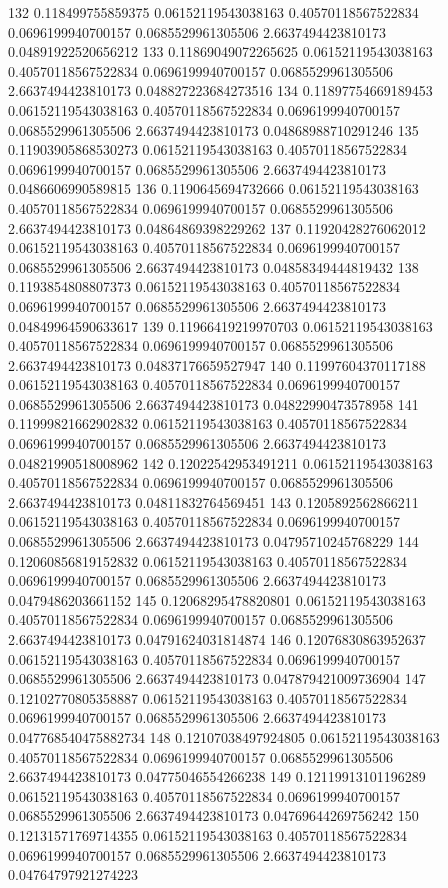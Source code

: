 {132 0.118499755859375 0.06152119543038163 0.40570118567522834 0.0696199940700157 0.0685529961305506 2.6637494423810173 0.04891922520656212
133 0.11869049072265625 0.06152119543038163 0.40570118567522834 0.0696199940700157 0.0685529961305506 2.6637494423810173 0.048827223684273516
134 0.11897754669189453 0.06152119543038163 0.40570118567522834 0.0696199940700157 0.0685529961305506 2.6637494423810173 0.04868988710291246
135 0.11903905868530273 0.06152119543038163 0.40570118567522834 0.0696199940700157 0.0685529961305506 2.6637494423810173 0.0486606990589815
136 0.1190645694732666 0.06152119543038163 0.40570118567522834 0.0696199940700157 0.0685529961305506 2.6637494423810173 0.04864869398229262
137 0.11920428276062012 0.06152119543038163 0.40570118567522834 0.0696199940700157 0.0685529961305506 2.6637494423810173 0.04858349444819432
138 0.1193854808807373 0.06152119543038163 0.40570118567522834 0.0696199940700157 0.0685529961305506 2.6637494423810173 0.04849964590633617
139 0.11966419219970703 0.06152119543038163 0.40570118567522834 0.0696199940700157 0.0685529961305506 2.6637494423810173 0.04837176659527947
140 0.11997604370117188 0.06152119543038163 0.40570118567522834 0.0696199940700157 0.0685529961305506 2.6637494423810173 0.04822990473578958
141 0.11999821662902832 0.06152119543038163 0.40570118567522834 0.0696199940700157 0.0685529961305506 2.6637494423810173 0.04821990518008962
142 0.12022542953491211 0.06152119543038163 0.40570118567522834 0.0696199940700157 0.0685529961305506 2.6637494423810173 0.04811832764569451
143 0.1205892562866211 0.06152119543038163 0.40570118567522834 0.0696199940700157 0.0685529961305506 2.6637494423810173 0.04795710245768229
144 0.12060856819152832 0.06152119543038163 0.40570118567522834 0.0696199940700157 0.0685529961305506 2.6637494423810173 0.0479486203661152
145 0.12068295478820801 0.06152119543038163 0.40570118567522834 0.0696199940700157 0.0685529961305506 2.6637494423810173 0.04791624031814874
146 0.12076830863952637 0.06152119543038163 0.40570118567522834 0.0696199940700157 0.0685529961305506 2.6637494423810173 0.047879421009736904
147 0.12102770805358887 0.06152119543038163 0.40570118567522834 0.0696199940700157 0.0685529961305506 2.6637494423810173 0.047768540475882734
148 0.12107038497924805 0.06152119543038163 0.40570118567522834 0.0696199940700157 0.0685529961305506 2.6637494423810173 0.04775046554266238
149 0.12119913101196289 0.06152119543038163 0.40570118567522834 0.0696199940700157 0.0685529961305506 2.6637494423810173 0.04769644269756242
150 0.12131571769714355 0.06152119543038163 0.40570118567522834 0.0696199940700157 0.0685529961305506 2.6637494423810173 0.04764797921274223
}
